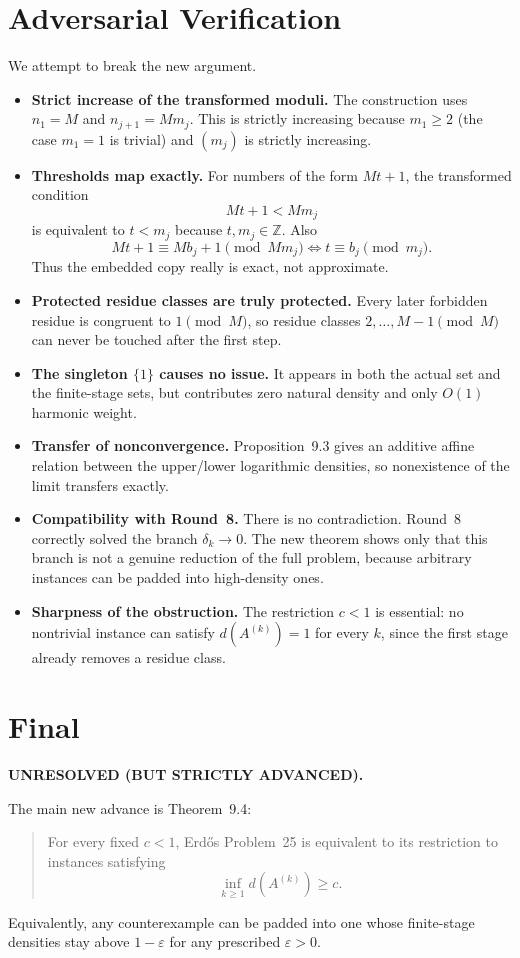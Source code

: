 \section{Adversarial Verification}
We attempt to break the new argument.
\begin{itemize}
\item \textbf{Strict increase of the transformed moduli.}  The construction uses $n_1=M$ and $n_{j+1}=Mm_j$.  This is strictly increasing because $m_1\ge 2$ (the case $m_1=1$ is trivial) and $(m_j)$ is strictly increasing.
\item \textbf{Thresholds map exactly.}  For numbers of the form $Mt+1$, the transformed condition
\[
Mt+1<Mm_j
\]
is equivalent to $t<m_j$ because $t,m_j\in\mathbb Z$.  Also
\[
Mt+1\equiv Mb_j+1\pmod{Mm_j}
\iff
 t\equiv b_j\pmod{m_j}.
\]
Thus the embedded copy really is exact, not approximate.
\item \textbf{Protected residue classes are truly protected.}  Every later forbidden residue is congruent to $1\pmod M$, so residue classes $2,\dots,M-1\pmod M$ can never be touched after the first step.
\item \textbf{The singleton $\{1\}$ causes no issue.}  It appears in both the actual set and the finite-stage sets, but contributes zero natural density and only $O(1)$ harmonic weight.
\item \textbf{Transfer of nonconvergence.}  Proposition~9.3 gives an additive affine relation between the upper/lower logarithmic densities, so nonexistence of the limit transfers exactly.
\item \textbf{Compatibility with Round~8.}  There is no contradiction.  Round~8 correctly solved the branch $\delta_k\to 0$.  The new theorem shows only that this branch is not a genuine reduction of the full problem, because arbitrary instances can be padded into high-density ones.
\item \textbf{Sharpness of the obstruction.}  The restriction $c<1$ is essential: no nontrivial instance can satisfy $d(A^{(k)})=1$ for every $k$, since the first stage already removes a residue class.
\end{itemize}

\section{Final}
\textbf{UNRESOLVED (BUT STRICTLY ADVANCED).}

The main new advance is Theorem~9.4:
\begin{quote}
For every fixed $c<1$, Erd\H{o}s Problem~25 is equivalent to its restriction to instances satisfying
\[
\inf_{k\ge 1} d(A^{(k)})\ge c.
\]
\end{quote}
Equivalently, any counterexample can be padded into one whose finite-stage densities stay above $1-\varepsilon$ for any prescribed $\varepsilon>0$.

